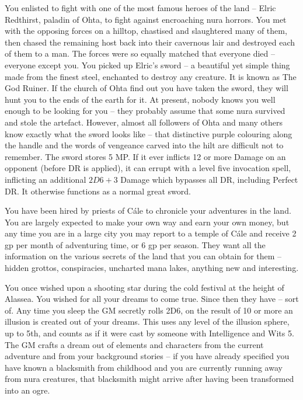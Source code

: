 \begin{list}{\addtocounter{list}{1}\textbf{:}}{\raggedleft}
\item{You enlisted to fight with one of the most famous heroes of the land -- Elric Redthirst, paladin of Ohta, to fight against encroaching nura horrors.  You met with the opposing forces on a hilltop, chastised and slaughtered many of them, then chased the remaining host back into their cavernous lair and destroyed each of them to a man.  The forces were so equally matched that everyone died -- everyone except you. You picked up Elric's sword -- a beautiful yet simple thing made from the finest steel, enchanted to destroy any creature.  It is known as The God Ruiner.  If the church of Ohta find out you have taken the sword, they will hunt you to the ends of the earth for it.  At present, nobody knows you well enough to be looking for you -- they probably assume that some nura survived and stole the artefact.  However, almost all followers of Ohta and many others know exactly what the sword looks like -- that distinctive purple colouring along the handle and the words of vengeance carved into the hilt are difficult not to remember.  The sword stores 5 MP.  If it ever inflicts 12 or more Damage on an opponent (before DR is applied), it can errupt with a level five invocation spell, inflicting an additional $2D6+3$ Damage which bypasses all DR, including Perfect DR.  It otherwise functions as a normal great sword.}

\item{You have been hired by priests of C\'{a}le to chronicle your adventures in the land.  You are largely expected to make your own way and earn your own money, but any time you are in a large city you may report to a temple of C\'{a}le and receive 2 gp per month of adventuring time, or 6 gp per season.  They want all the information on the various secrets of the land that you can obtain for them -- hidden grottos, conspiracies, uncharted mana lakes, anything new and interesting.}

\item{You once wished upon a shooting star during the cold festival at the height of Alassea. You wished for all your dreams to come true.  Since then they have -- sort of.  Any time you sleep the GM secretly rolls 2D6, on the result of 10 or more an illusion is created out of your dreams.  This uses any level of the illusion sphere, up to 5th, and counts as if it were cast by someone with Intelligence and Wits 5.  The GM crafts a dream out of elements and characters from the current adventure and from your background stories -- if you have already specified you have known a blacksmith from childhood and you are currently running away from nura creatures, that blacksmith might arrive after having been transformed into an ogre.}


\end{list}
